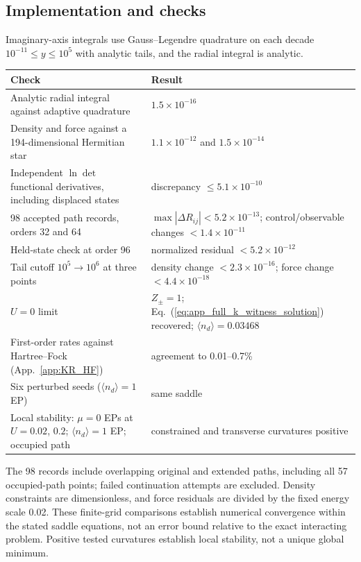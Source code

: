 \documentclass[%
  aps,physrev,onecolumn,10pt,amsmath,amssymb,superscriptaddress,longbibliography,floatfix
]{revtex4-2}
\begin{document}
\subsection{Implementation and checks}
Imaginary-axis integrals use Gauss--Legendre quadrature on each decade
$10^{-11}\leq y\leq10^{5}$ with analytic tails, and the radial integral is
analytic.
\begin{center}
\begin{tabular}{@{}p{}p{}@{}}
\toprule
Check & Result\\
\midrule
Analytic radial integral against adaptive quadrature & $1.5\times10^{-16}$\\
Density and force against a 194-dimensional Hermitian star & $1.1\times10^{-12}$ and $1.5\times10^{-14}$\\
Independent $\ln\det$ functional derivatives, including displaced states & discrepancy $\leq5.1\times10^{-10}$\\
98 accepted path records, orders 32 and 64 & $\max|\Delta R_{ij}|<5.2\times10^{-13}$; control/observable changes $<1.4\times10^{-11}$\\
Held-state check at order 96 & normalized residual $<5.2\times10^{-12}$\\
Tail cutoff $10^5\to10^6$ at three points & density change $<2.3\times10^{-16}$; force change $<4.4\times10^{-18}$\\
$U=0$ limit & $Z_\pm=1$; Eq.~(\ref{eq:app_full_k_witness_solution}) recovered; $\langle n_d\rangle=0.03468$\\
First-order rates against Hartree--Fock (App.~\ref{app:KR_HF}) & agreement to 0.01--0.7\%\\
Six perturbed seeds ($\langle n_d\rangle=1$ EP) & same saddle\\
Local stability: $\mu=0$ EPs at $U=0.02$, $0.2$; $\langle n_d\rangle=1$ EP; occupied path & constrained and transverse curvatures positive\\
\bottomrule
\end{tabular}
\end{center}
The 98 records include overlapping original and extended paths, including
all 57 occupied-path points; failed continuation attempts are excluded.
Density constraints are dimensionless, and force residuals are divided by
the fixed energy scale 0.02. These finite-grid comparisons establish
numerical convergence within the stated saddle equations, not an error
bound relative to the exact interacting problem. Positive tested
curvatures establish local stability, not a unique global minimum.
\end{document}
